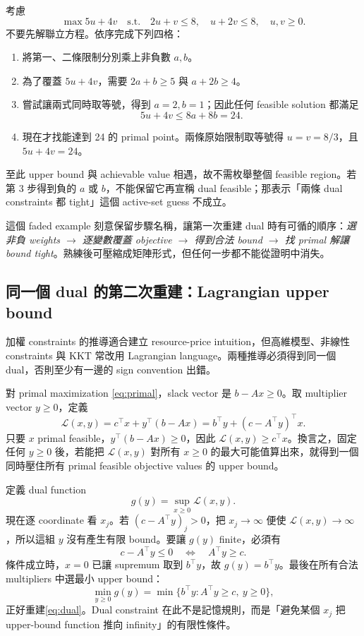\documentclass[11pt,a4paper,oneside,openany]{book}
\begin{document}
\begin{example}
考慮
\[
 \max 5u+4v
 \quad\text{s.t.}\quad
 2u+v\le8,\quad u+2v\le8,\quad u,v\ge0.
\]
不要先解聯立方程。依序完成下列四格：
\begin{enumerate}[label=\arabic*.]
\item 將第一、二條限制分別乘上非負數 $a,b$。
\item 為了覆蓋 $5u+4v$，需要 $2a+b\ge5$ 與 $a+2b\ge4$。
\item 嘗試讓兩式同時取等號，得到 $a=2,b=1$；因此任何 feasible solution 都滿足
\[
 5u+4v\le 8a+8b=24.
\]
\item 現在才找能達到 24 的 primal point。兩條原始限制取等號得 $u=v=8/3$，且 $5u+4v=24$。
\end{enumerate}
至此 upper bound 與 achievable value 相遇，故不需枚舉整個 feasible region。若第 3 步得到負的 $a$ 或 $b$，不能保留它再宣稱 dual feasible；那表示「兩條 dual constraints 都 tight」這個 active-set guess 不成立。
\end{example}

這個 faded example 刻意保留步驟名稱，讓第一次重建 dual 時有可循的順序：\emph{選非負 weights $\to$ 逐變數覆蓋 objective $\to$ 得到合法 bound $\to$ 找 primal 解讓 bound tight}。熟練後可壓縮成矩陣形式，但任何一步都不能從證明中消失。

\subsection{同一個 dual 的第二次重建：Lagrangian upper bound}
加權 constraints 的推導適合建立 resource-price intuition，但高維模型、非線性 constraints 與 KKT 常改用 Lagrangian language。兩種推導必須得到同一個 dual，否則至少有一邊的 sign convention 出錯。

對 primal maximization \cref{eq:primal}，slack vector 是 $b-Ax\ge0$。取 multiplier vector $y\ge0$，定義
\begin{equation}
 \mathcal L(x,y)
 =c^\top x+y^\top(b-Ax)
 =b^\top y+(c-A^\top y)^\top x.
 \label{eq:lp-lagrangian}
\end{equation}
只要 $x$ primal feasible，$y^\top(b-Ax)\ge0$，因此 $\mathcal L(x,y)\ge c^\top x$。換言之，固定任何 $y\ge0$ 後，若能把 $\mathcal L(x,y)$ 對所有 $x\ge0$ 的最大可能值算出來，就得到一個同時壓住所有 primal feasible objective values 的 upper bound。

定義 dual function
\[
 g(y)=\sup_{x\ge0}\mathcal L(x,y).
\]
現在逐 coordinate 看 $x_j$。若 $(c-A^\top y)_j>0$，把 $x_j\to\infty$ 便使 $\mathcal L(x,y)\to\infty$，所以這組 $y$ 沒有產生有限 bound。要讓 $g(y)$ finite，必須有
\[
 c-A^\top y\le0
 \quad\Longleftrightarrow\quad
 A^\top y\ge c.
\]
條件成立時，$x=0$ 已讓 supremum 取到 $b^\top y$，故 $g(y)=b^\top y$。最後在所有合法 multipliers 中選最小 upper bound：
\[
 \min_{y\ge0}g(y)
 =\min\{b^\top y:A^\top y\ge c,\ y\ge0\},
\]
正好重建\cref{eq:dual}。Dual constraint 在此不是記憶規則，而是「避免某個 $x_j$ 把 upper-bound function 推向 infinity」的有限性條件。
\end{document}
